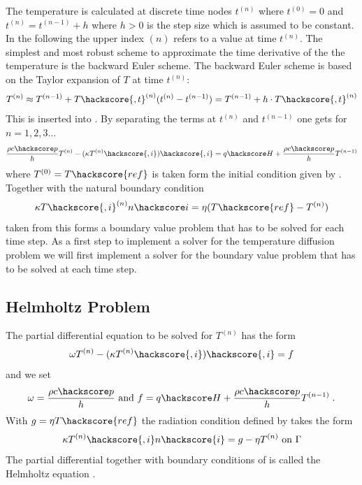 The temperature is calculated at discrete time nodes $t^{(n)}$ where 
$t^{(0)}=0$ and  $t^{(n)}=t^{(n-1)}+h$ where $h>0$ is the step size which is assumed to be constant. 
In the following the upper index ${(n)}$ refers to a value at time $t^{(n)}$. The simplest
and most robust scheme to approximate the time derivative of the the temperature is 
the backward Euler
 scheme. The backward Euler 
scheme is based
on the Taylor expansion of $T$ at time $t^{(n)}$:
\begin{equation}
T^{(n)}\approx T^{(n-1)}+T\hackscore{,t}^{(n)}(t^{(n)}-t^{(n-1)})
=T^{(n-1)} + h \cdot T\hackscore{,t}^{(n)}
\label{DIFFUSION TEMP EQ 6}
\end{equation}
This is inserted into . By separating the terms at 
$t^{(n)}$ and  $t^{(n-1)}$ one gets for $n=1,2,3\ldots$
\begin{equation}
\frac{\rho c\hackscore p}{h} T^{(n)} - (\kappa T^{(n)}\hackscore{,i})\hackscore{,i} = q\hackscore H +  \frac{\rho c\hackscore p}{h} T^{(n-1)}
\label{DIFFUSION TEMP EQ 7}
\end{equation}
where $T^{(0)}=T\hackscore{ref}$ is taken form the initial condition given by .
Together with the natural boundary condition 
\begin{equation}
 \kappa T\hackscore{,i}^{(n)} n\hackscore i = \eta (T\hackscore{ref}-T^{(n)}) 
\label{DIFFUSION TEMP EQ 2222}
\end{equation}
taken from 
this forms a boundary value problem that has to be solved for each time step. 
As a first step to implement a solver for the temperature diffusion problem we will 
first implement a solver for the  boundary value problem that has to be solved at each time step.

\subsection{\label{DIFFUSION HELM SEC}Helmholtz Problem}
The partial differential equation to be solved for $T^{(n)}$ has the form 
\begin{equation}
\omega T^{(n)}  - (\kappa T^{(n)}\hackscore{,i})\hackscore{,i} = f
\label{DIFFUSION HELM EQ 1}
\end{equation}
and we set
\begin{equation}
\omega=\frac{\rho c\hackscore p}{h} \mbox{ and } f=q\hackscore H +\frac{\rho c\hackscore p}{h}T^{(n-1)} \;.
\label{DIFFUSION HELM EQ 1b}
\end{equation}
With $g=\eta T\hackscore{ref}$ the radiation condition defined by 
takes the form 
\begin{equation}
\kappa T^{(n)}\hackscore{,i} n\hackscore{i} =  g - \eta T^{(n)}\mbox{ on } \Gamma
\label{DIFFUSION HELM EQ 2}
\end{equation}
The partial differential  together with boundary conditions of 
is called the Helmholtz equation . 

